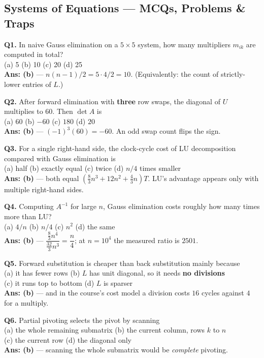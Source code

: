 \subsection{Systems of Equations --- MCQs, Problems \& Traps}

\begin{mcqbox}
\textbf{Q1.} In naive Gauss elimination on a $5\times5$ system, how many multipliers $m_{ik}$ are computed in total?\\
(a) 5 \quad (b) 10 \quad (c) 20 \quad (d) 25\\
\textbf{Ans: (b)} --- $n(n-1)/2 = 5\cdot4/2 = 10$. (Equivalently: the count of strictly-lower entries of $L$.)

\textbf{Q2.} After forward elimination with \textbf{three} row swaps, the diagonal of $U$ multiplies to $60$. Then $\det A$ is\\
(a) $60$ \quad (b) $-60$ \quad (c) $180$ \quad (d) $20$\\
\textbf{Ans: (b)} --- $(-1)^3(60) = -60$. An odd swap count flips the sign.

\textbf{Q3.} For a single right-hand side, the clock-cycle cost of LU decomposition compared with Gauss elimination is\\
(a) half \quad (b) exactly equal \quad (c) twice \quad (d) $n/4$ times smaller\\
\textbf{Ans: (b)} --- both equal $\left(\frac83n^3+12n^2+\frac43n\right)T$. LU's advantage appears only with multiple right-hand sides.

\textbf{Q4.} Computing $A^{-1}$ for large $n$, Gauss elimination costs roughly how many times more than LU?\\
(a) $4/n$ \quad (b) $n/4$ \quad (c) $n^2$ \quad (d) the same\\
\textbf{Ans: (b)} --- $\dfrac{\frac83n^4}{\frac{32}{3}n^3} = \dfrac{n}{4}$; at $n = 10^4$ the measured ratio is $2501$.

\textbf{Q5.} Forward substitution is cheaper than back substitution mainly because\\
(a) it has fewer rows \quad (b) $L$ has unit diagonal, so it needs \textbf{no divisions}\\
(c) it runs top to bottom \quad (d) $L$ is sparser\\
\textbf{Ans: (b)} --- and in the course's cost model a division costs $16$ cycles against $4$ for a multiply.

\textbf{Q6.} Partial pivoting selects the pivot by scanning\\
(a) the whole remaining submatrix \quad (b) the current column, rows $k$ to $n$\\
(c) the current row \quad (d) the diagonal only\\
\textbf{Ans: (b)} --- scanning the whole submatrix would be \emph{complete} pivoting.


\end{mcqbox}
